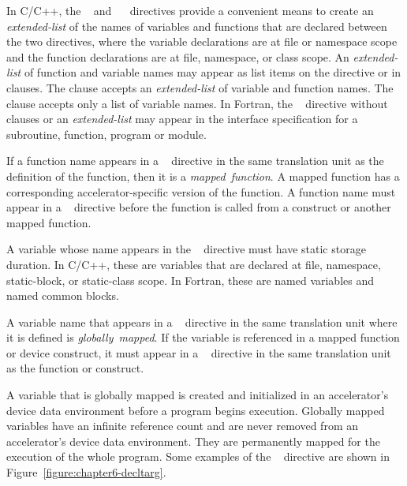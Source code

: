 In C/C++, the ~ and
~~ directives provide a convenient means
to create an \emph{extended-list} of the names of variables and functions that are
declared between the two directives, where the variable declarations are at
file or namespace scope and the function declarations are at file, namespace, or
class scope.
An \emph{extended-list} of function and variable names may appear as list items on
the directive or in clauses.  The  clause accepts an
\emph{extended-list} of variable and function names.  The  clause
accepts only a list of variable names.  
In Fortran, the ~ directive without clauses or an
\emph{extended-list} may appear in the interface specification for a
subroutine, function, program or module. 


If a function name appears in a ~ directive in the
same translation unit as the definition of the function, then it is a
\emph{mapped}~\emph{function}.  A mapped function has a corresponding
accelerator-specific version of the function.  A function name must appear in a
~ directive before the function is called from a
 construct or another mapped function.

A variable whose name appears in the ~ directive
must have static storage duration.  In C/C++, these are variables that are
declared at file, namespace, static-block, or static-class scope. In Fortran,
these are named variables and named common blocks.

A variable name that appears in a ~ directive in
the same translation unit where it is defined is 
\emph{globally}~\emph{mapped}.  
If the variable is referenced in a mapped function or
device construct, it must appear in a ~ directive in
the same translation unit as the function or construct.

A variable that is globally mapped is created and initialized in an
accelerator's device data environment before a program begins execution.
Globally mapped variables have an infinite reference count and are never
removed from an accelerator's device data environment.  They are permanently
mapped for the execution of the whole program.  Some examples of the
~ directive are shown in
Figure~\ref{figure:chapter6-decltarg}.

